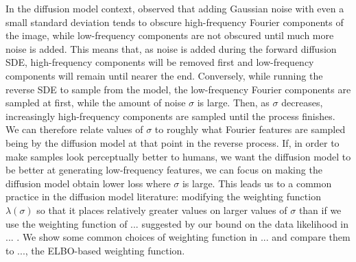In the diffusion model context, \citet{yang2023diffusion} observed that adding Gaussian noise with even a small standard deviation tends to obscure high-frequency Fourier components of the image, while low-frequency components are not obscured until much more noise is added. This means that, as noise is added during the forward diffusion SDE, high-frequency components will be removed first and low-frequency components will remain until nearer the end. Conversely, while running the reverse SDE to sample from the model, the low-frequency Fourier components are sampled at first, while the amount of noise $\sigma$ is large. Then, as $\sigma$ decreases, increasingly high-frequency components are sampled until the process finishes. We can therefore relate values of $\sigma$ to roughly what Fourier features are sampled being by the diffusion model at that point in the reverse process. If, in order to make samples look perceptually better to humans, we want the diffusion model to be better at generating low-frequency features, we can focus on making the diffusion model obtain lower loss where $\sigma$ is large. This leads us to a common practice in the diffusion model literature: modifying the weighting function $\lambda(\sigma)$ so that it places relatively greater values on larger values of $\sigma$ than if we use the weighting function of ... suggested by our bound on the data likelihood in ... . We show some common choices of weighting function in ... and compare them to ..., the ELBO-based weighting function.

